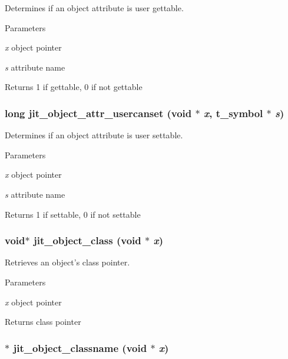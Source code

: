 Determines if an object attribute is user gettable. 
\begin{DoxyParams}{Parameters}
\item[{\em x}]object pointer \item[{\em s}]attribute name\end{DoxyParams}
\begin{DoxyReturn}{Returns}
1 if gettable, 0 if not gettable 
\end{DoxyReturn}
\hypertarget{group__objectmod_gab5c10166fd7e2505b76a25e1cf0b6b09}{
\subsubsection[{jit\_\-object\_\-attr\_\-usercanset}]{\setlength{\rightskip}{0pt plus 5cm}long jit\_\-object\_\-attr\_\-usercanset (void $\ast$ {\em x}, \/  {\bf t\_\-symbol} $\ast$ {\em s})}}
\label{group__objectmod_gab5c10166fd7e2505b76a25e1cf0b6b09}


Determines if an object attribute is user settable. 
\begin{DoxyParams}{Parameters}
\item[{\em x}]object pointer \item[{\em s}]attribute name\end{DoxyParams}
\begin{DoxyReturn}{Returns}
1 if settable, 0 if not settable 
\end{DoxyReturn}
\hypertarget{group__objectmod_gaecadd79da84aa20fe845cc4916f25721}{
\subsubsection[{jit\_\-object\_\-class}]{\setlength{\rightskip}{0pt plus 5cm}void$\ast$ jit\_\-object\_\-class (void $\ast$ {\em x})}}
\label{group__objectmod_gaecadd79da84aa20fe845cc4916f25721}


Retrieves an object's class pointer. 
\begin{DoxyParams}{Parameters}
\item[{\em x}]object pointer\end{DoxyParams}
\begin{DoxyReturn}{Returns}
class pointer 
\end{DoxyReturn}
\hypertarget{group__objectmod_ga2d3302646e6bf59b4960dd0656632095}{
\subsubsection[{jit\_\-object\_\-classname}]{$\ast$ jit\_\-object\_\-classname (void $\ast$ {\em x})}}
\label{group__objectmod_ga2d3302646e6bf59b4960dd0656632095}


